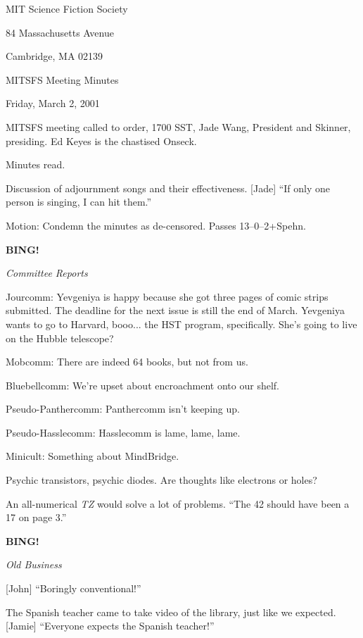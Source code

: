 \documentclass[12pt]{article}
\newcommand{\bing}{{\bf BING!} }
\newcommand{\goto}[1]{\bing \vskip 12pt \centerline{{\em{#1}}}}
\begin{document}
\begin{center}

MIT Science Fiction Society 

84 Massachusetts Avenue

Cambridge, MA 02139

\vspace{12pt}

MITSFS Meeting Minutes 

Friday, March 2, 2001

\end{center}
 
\vspace{18pt}

\setlength{\parskip}{6pt}

\noindent
MITSFS meeting called to order, 1700 SST, Jade Wang, President and
Skinner, presiding.  Ed Keyes is the chastised Onseck.

Minutes read.

Discussion of adjournment songs and their effectiveness.  [Jade]
``If only one person is singing, I can hit them.''

Motion: Condemn the minutes as de-censored.  Passes 13--0--2+Spehn.

\goto{Committee Reports}

Jourcomm: Yevgeniya is happy because she got three pages of comic
strips submitted.  The deadline for the next issue is still the end
of March.  Yevgeniya wants to go to Harvard, booo... the HST program,
specifically.  She's going to live on the Hubble telescope?

Mobcomm: There are indeed 64 books, but not from us.

Bluebellcomm: We're upset about encroachment onto our shelf.

Pseudo-Panthercomm: Panthercomm isn't keeping up.

Pseudo-Hasslecomm: Hasslecomm is lame, lame, lame.

Minicult: Something about MindBridge.

Psychic transistors, psychic diodes.  Are thoughts like electrons
or holes?

An all-numerical {\em TZ} would solve a lot of problems.  ``The 42 should
have been a 17 on page 3.''

\goto{Old Business}

[John] ``Boringly conventional!''

The Spanish teacher came to take video of the library, just like we
expected.  [Jamie] ``Everyone expects the Spanish teacher!''
\end{document}
